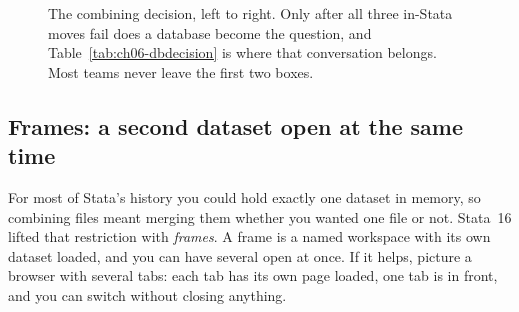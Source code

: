 \begin{figure}[htbp]
\centering
{}
\caption[Append, merge, frames, or a database]{The combining decision, left to right. Only after all three in-Stata moves fail does a database become the question, and Table~\ref{tab:ch06-dbdecision} is where that conversation belongs. Most teams never leave the first two boxes.}
\label{fig:ch06-combine}
\end{figure}

\subsection{Frames: a second dataset open at the same time}\label{sec:ch06-frames}
For most of Stata's history you could hold exactly one dataset in memory, so combining files meant merging them whether you wanted one file or not. Stata~16 lifted that restriction with \emph{frames}. A frame is a named workspace with its own dataset loaded, and you can have several open at once. If it helps, picture a browser with several tabs: each tab has its own page loaded, one tab is in front, and you can switch without closing anything.

